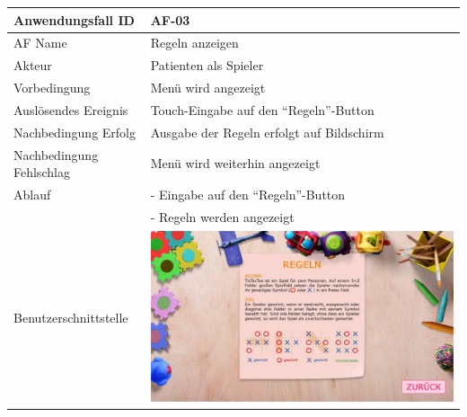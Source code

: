 \documentclass[12pt]{article}
\begin{document}
\begin{tabularx}{\textwidth}{|l|X|} \hline
Anwendungsfall ID&AF-03\\ \hline
AF Name&Regeln anzeigen\\ \hline
Akteur&Patienten als Spieler\\ \hline
Vorbedingung&Menü wird angezeigt\\ \hline
Auslösendes Ereignis&Touch-Eingabe auf den "`Regeln"'-\Gls{Button}\\ \hline
Nachbedingung Erfolg&Ausgabe der Regeln erfolgt auf Bildschirm\\ \hline
Nachbedingung Fehlschlag&Menü wird weiterhin angezeigt\\ \hline
Ablauf&- Eingabe auf den "`Regeln"'-\Gls{Button}\\&- Regeln werden angezeigt\\ \hline
Benutzerschnittstelle&\includegraphics[scale=0.33]{Regeln.pdf}\\ \hline
\end{tabularx}\\
\end{document}
